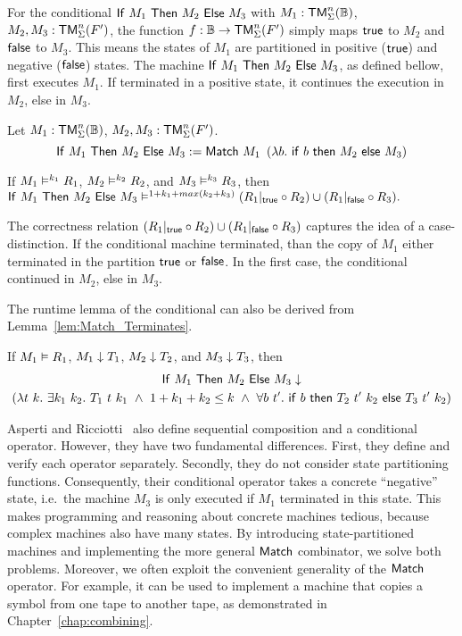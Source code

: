 For the conditional $\mathsf{If}~M_1~\mathsf{Then}~M_2~\mathsf{Else}~M_3$ with $M_1 : \mathsf{TM}_\Sigma^n(\mathbb{B})$, $M_2, M_3 : \mathsf{TM}_\Sigma^n(F')$, the function
$f : \mathbb{B} \rightarrow \mathsf{TM}_\Sigma^n(F')$ simply maps $\mathsf{true}$ to $M_2$ and $\mathsf{false}$ to $M_3$.  This means the states of $M_1$ are partitioned in positive
($\mathsf{true}$) and negative ($\mathsf{false}$) states.  The machine $\mathsf{If}~M_1~\mathsf{Then}~M_2~\mathsf{Else}~M_3$, as defined bellow, first executes $M_1$.  If terminated in a positive
state, it continues the execution in $M_2$, else in $M_3$.

\begin{definition}[Conditional]
  \label{def:If}
  Let $M_1 : \mathsf{TM}_\Sigma^n(\mathbb{B})$, $M_2, M_3 : \mathsf{TM}_\Sigma^n(F')$.
  \[
    \mathsf{If}~M_1~\mathsf{Then}~M_2~\mathsf{Else}~M_3 := \mathsf{Match}~M_1~
    \left(\lambda b.~\mathsf{if}~b~\mathsf{then}~M_2~\mathsf{else}~M_3 \right)
  \]
\end{definition}

\begin{lemma}
  \label{lem:If_RealiseIn}
  If $M_1 \mathrel{\vDash^{k_1}} R_1$, $M_2 \mathrel{\vDash^{k_2}} R_2$, and $M_3 \mathrel{\vDash^{k_3}} R_3$, then
  $
    \mathsf{If}~M_1~\mathsf{Then}~M_2~\mathsf{Else}~M_3 \mathrel{\vDash^{1+k_1+max(k_2+k_3)}} (R_1{|}_{\mathsf{true}} \circ R_2) \cup (R_1{|}_{\mathsf{false}} \circ R_3).
  $
\end{lemma}

The correctness relation $(R_1{|}_{\mathsf{true}} \circ R_2) \cup (R_1{|}_{\mathsf{false}} \circ R_3)$ captures the idea of a case-distinction.  If the conditional machine
terminated, than the copy of $M_1$ either terminated in the partition $\mathsf{true}$ or $\mathsf{false}$.  In the first case, the conditional continued in $M_2$,
else in $M_3$.

The runtime lemma of the conditional can also be derived from Lemma~\ref{lem:Match_Terminates}.
\begin{lemma}
  \label{lem:If_TerminatesIn}
  If $M_1 \mathrel{\vDash} R_1$, $M_1 \mathrel{\downarrow} T_1$, $M_2 \mathrel{\downarrow} T_2$, and $M_3 \mathrel{\downarrow} T_3$, then
  \begin{multline*}
    \mathsf{If}~M_1~\mathsf{Then}~M_2~\mathsf{Else}~M_3 \mathrel{\downarrow} \\
    \left( \lambda t~k.~\exists k_1~k_2.~T_1~t~k_1 ~\land~ 1+k_1+k_2 \leq k ~\land~ \forall b~t'.~\mathsf{if}~b~\mathsf{then}~T_2~t'~k_2~\mathsf{else}~T_3~t'~k_2 \right)
  \end{multline*}
\end{lemma}


Asperti and Ricciotti~\cite{asperti2015} also define sequential composition and a conditional operator.  However, they have two fundamental
differences.  First, they define and verify each operator separately.  Secondly, they do not consider state partitioning functions.  Consequently,
their conditional operator takes a concrete ``negative'' state, i.e.\ the machine $M_3$ is only executed if $M_1$ terminated in this state.  This
makes programming and reasoning about concrete machines tedious, because complex machines also have many states.  By introducing state-partitioned
machines and implementing the more general $\mathsf{Match}$ combinator, we solve both problems.  Moreover, we often exploit the convenient generality of the
$\mathsf{Match}$ operator.  For example, it can be used to implement a machine that copies a symbol from one tape to another tape, as demonstrated in
Chapter~\ref{chap:combining}.


